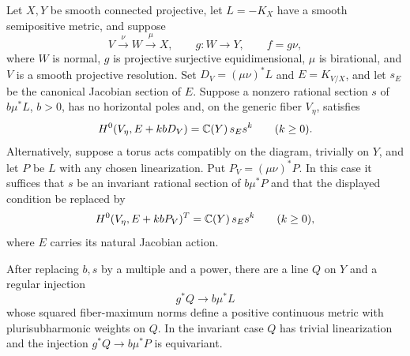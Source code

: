 \begin{proposition}\label{har:prop:maximum}
Let \(X,Y\) be smooth connected projective, let \(L=-K_X\) have a smooth
semipositive metric, and suppose
\[
 V\xrightarrow{\nu}W\xrightarrow{\mu}X,\qquad g:W\to Y,
 \qquad f=g\nu,
\]
where \(W\) is normal, \(g\) is projective surjective equidimensional,
\(\mu\) is birational, and \(V\) is a smooth projective resolution.
Set \(D_V=(\mu\nu)^*L\) and \(E=K_{V/X}\), and let \(s_E\) be the canonical Jacobian section of \(E\).
Suppose a nonzero rational section \(s\) of \(b\mu^*L\), \(b>0\), has
no horizontal poles and, on the generic fiber $V_\eta$, satisfies
\[
 H^0(V_\eta,E+kbD_V)=\mathbb C(Y)\,s_Es^k
 \qquad(k\ge0).
\]
Alternatively, suppose a torus acts compatibly on the diagram, trivially
on $Y$, and let $P$ be $L$ with any chosen linearization. Put
$P_V=(\mu\nu)^*P$. In this case it suffices that $s$ be an invariant
rational section of $b\mu^*P$ and that the displayed condition be
replaced by
\[
 H^0(V_\eta,E+kbP_V)^T=\mathbb C(Y)\,s_Es^k
 \qquad(k\ge0),
\]
where $E$ carries its natural Jacobian action.

After replacing \(b,s\) by a multiple and a power, there are a
line \(Q\) on \(Y\) and a regular injection
\[
 g^*Q\longrightarrow b\mu^*L
\]
whose squared fiber-maximum norms define a positive continuous metric
with plurisubharmonic weights on \(Q\).
In the invariant case $Q$ has trivial linearization and the injection
$g^*Q\to b\mu^*P$ is equivariant.
\end{proposition}

